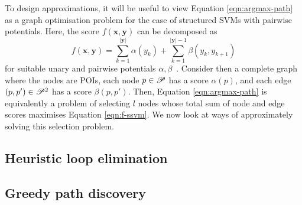 
To design approximations, it will be useful to view Equation \ref{eqn:argmax-path} as a graph optimisation problem
for the case of structured SVMs with pairwise potentials.
Here, the score $f(\mathbf{x}, \mathbf{y})$ can be decomposed as
\begin{equation}
	\label{eqn:f-ssvm}
	f(\mathbf{x}, \mathbf{y}) = \sum_{k = 1}^{|\mathbf{y}|} \alpha( y_k ) + \sum_{k = 1}^{|\mathbf{y}| - 1} \beta( y_k, y_{k+1} )
\end{equation}
for suitable unary and pairwise potentials $\alpha, \beta$~\cite{Chen:2017}.
Consider then a complete graph where the nodes are POIs, each node $p \in \mathscr{P}$ has a score $\alpha( p )$, and each edge $(p, p') \in \mathscr{P}^2$ has a score $\beta( p, p' )$.
Then, Equation \ref{eqn:argmax-path} is equivalently a problem of selecting $l$ nodes whose
total sum of node and edge scores maximises Equation \ref{eqn:f-ssvm}.
We now look at ways of approximately solving this selection problem.

\subsection{Heuristic loop elimination}
\label{sec:loop-elim}


\subsection{Greedy path discovery}
\label{sec:greedy}


% 
